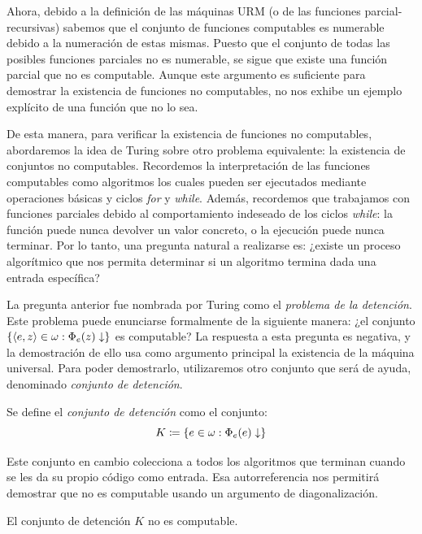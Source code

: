 Ahora, debido a la definición de las máquinas URM (o de las funciones parcial-recursivas) sabemos que el conjunto de funciones computables es numerable debido a la numeración de estas mismas. Puesto que el conjunto de todas las posibles funciones parciales no es numerable, se sigue que existe una función parcial que no es computable. Aunque este argumento es suficiente para demostrar la existencia de funciones no computables, no nos exhibe un ejemplo explícito de una función que no lo sea.

De esta manera, para verificar la existencia de funciones no computables, abordaremos la idea de Turing sobre otro problema equivalente: la existencia de conjuntos no computables. Recordemos la interpretación de las funciones computables como algoritmos los cuales pueden ser ejecutados mediante operaciones básicas y ciclos \emph{for} y \emph{while}. Además, recordemos que trabajamos con funciones parciales debido al comportamiento indeseado de los ciclos \emph{while}: la función puede nunca devolver un valor concreto, o la ejecución puede nunca terminar. Por lo tanto, una pregunta natural a realizarse es: ¿existe un proceso algorítmico que nos permita determinar si un algoritmo termina dada una entrada específica?

La pregunta anterior fue nombrada por Turing como el \emph{problema de la detención}. Este problema puede enunciarse formalmente de la siguiente manera: ¿el conjunto $\set*{\inner*{e, z}\in\omega:\Phi_e\pa*{z}\ACABA}$ es computable? La respuesta a esta pregunta es negativa, y la demostración de ello usa como argumento principal la existencia de la máquina universal. Para poder demostrarlo, utilizaremos otro conjunto que será de ayuda, denominado \emph{conjunto de detención}.

\begin{definition}
	\label{def: conjunto_de_detencion}
	Se define el \emph{conjunto de detención} como el conjunto:
	\[
		K\coloneqq\set*{e\in\omega:\Phi_e\pa*{e}\ACABA}
	\]
\end{definition}

Este conjunto en cambio colecciona a todos los algoritmos que terminan cuando se les da su propio código como entrada. Esa autorreferencia nos permitirá demostrar que no es computable usando un argumento de diagonalización.

\begin{theorem}
	\label{thm: teorema_de_turing}
	El conjunto de detención $K$ no es computable.
\end{theorem}

